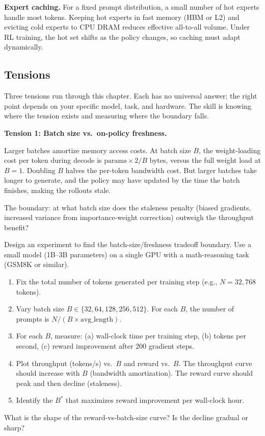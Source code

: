 \textbf{Expert caching.} For a fixed prompt distribution, a small number of hot experts handle most tokens. Keeping hot experts in fast memory (HBM or L2) and evicting cold experts to CPU DRAM reduces effective all-to-all volume. Under RL training, the hot set shifts as the policy changes, so caching must adapt dynamically.

\subsection*{Tensions}

Three tensions run through this chapter. Each has no universal answer; the right point depends on your specific model, task, and hardware. The skill is knowing where the tension exists and measuring where the boundary falls.


\textbf{Tension 1: Batch size vs.\ on-policy freshness.}

Larger batches amortize memory access costs. At batch size $B$, the weight-loading cost per token during decode is $\text{params} \times 2 / B$ bytes, versus the full weight load at $B = 1$. Doubling $B$ halves the per-token bandwidth cost. But larger batches take longer to generate, and the policy may have updated by the time the batch finishes, making the rollouts stale.

The boundary: at what batch size does the staleness penalty (biased gradients, increased variance from importance-weight correction) outweigh the throughput benefit?

\begin{exercise}
Design an experiment to find the batch-size/freshness tradeoff boundary. Use a small model (1B--3B parameters) on a single GPU with a math-reasoning task (GSM8K or similar).

\begin{enumerate}
  \item Fix the total number of tokens generated per training step (e.g., $N = 32{,}768$ tokens).
  \item Vary batch size $B \in \{32, 64, 128, 256, 512\}$. For each $B$, the number of prompts is $N / (B \times \text{avg\_length})$.
  \item For each $B$, measure: (a) wall-clock time per training step, (b) tokens per second, (c) reward improvement after 200 gradient steps.
  \item Plot throughput (tokens/s) vs.\ $B$ and reward vs.\ $B$. The throughput curve should increase with $B$ (bandwidth amortization). The reward curve should peak and then decline (staleness).
  \item Identify the $B^*$ that maximizes reward improvement per wall-clock hour.
\end{enumerate}

What is the shape of the reward-vs-batch-size curve? Is the decline gradual or sharp?
\end{exercise}

